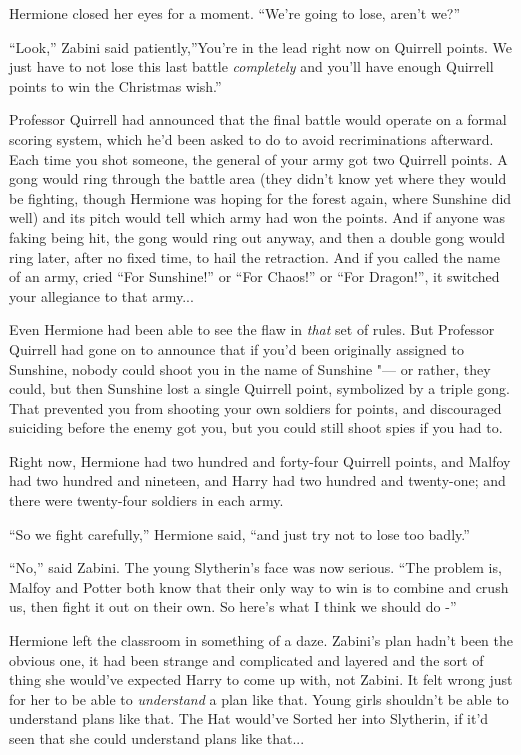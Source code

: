 Hermione closed her eyes for a moment. ``We're going to lose, aren't
we?''

``Look,'' Zabini said patiently,''You're in the lead right now on
Quirrell points. We just have to not lose this last battle
\emph{completely} and you'll have enough Quirrell points to win the
Christmas wish.''

Professor Quirrell had announced that the final battle would operate on
a formal scoring system, which he'd been asked to do to avoid
recriminations afterward. Each time you shot someone, the general of
your army got two Quirrell points. A gong would ring through the battle
area (they didn't know yet where they would be fighting, though Hermione
was hoping for the forest again, where Sunshine did well) and its pitch
would tell which army had won the points. And if anyone was faking being
hit, the gong would ring out anyway, and then a double gong would ring
later, after no fixed time, to hail the retraction. And if you called
the name of an army, cried ``For Sunshine!'' or ``For Chaos!'' or ``For
Dragon!'', it switched your allegiance to that army...

Even Hermione had been able to see the flaw in \emph{that} set of rules.
But Professor Quirrell had gone on to announce that if you'd been
originally assigned to Sunshine, nobody could shoot you in the name of
Sunshine "--- or rather, they could, but then Sunshine lost a single
Quirrell point, symbolized by a triple gong. That prevented you from
shooting your own soldiers for points, and discouraged suiciding before
the enemy got you, but you could still shoot spies if you had to.

Right now, Hermione had two hundred and forty-four Quirrell points, and
Malfoy had two hundred and nineteen, and Harry had two hundred and
twenty-one; and there were twenty-four soldiers in each army.

``So we fight carefully,'' Hermione said, ``and just try not to lose too
badly.''

``No,'' said Zabini. The young Slytherin's face was now serious. ``The
problem is, Malfoy and Potter both know that their only way to win is to
combine and crush us, then fight it out on their own. So here's what I
think we should do -''

Hermione left the classroom in something of a daze. Zabini's plan hadn't
been the obvious one, it had been strange and complicated and layered
and the sort of thing she would've expected Harry to come up with, not
Zabini. It felt wrong just for her to be able to \emph{understand} a
plan like that. Young girls shouldn't be able to understand plans like
that. The Hat would've Sorted her into Slytherin, if it'd seen that she
could understand plans like that...

